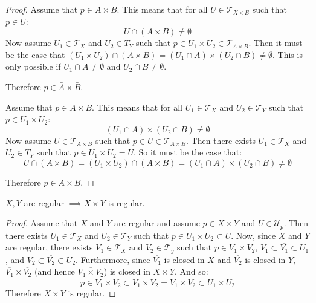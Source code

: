 \documentclass[letterpaper,12pt,fleqn]{article}
\newcommand{\T}{\mathscr{T}}
\newcommand{\U}{\mathcal{U}}
\begin{document}
\begin{proof}
  Assume that \(p\in\overline{A\times B}\).  This means that for all \(U\in\T_{X\times B}\) such that \(p\in U\):
  \[U\cap(A\times B)\ne\emptyset\]
  Now assume \(U_1\in\T_X\) and \(U_2\in T_Y\) such that \(p\in U_1\times U_2\in\T_{A\times B}\).  Then it must be the
  case that \((U_1\times U_2)\cap(A\times B)=(U_1\cap A)\times(U_2\cap B)\ne\emptyset\).  This is only possible if
  \(U_1\cap A\ne\emptyset\) and \(U_2\cap B\ne\emptyset\).

  Therefore \(p\in\bar{A}\times\bar{B}\).

  Assume that \(p\in\bar{A}\times\bar{B}\).  This means that for all \(U_1\in\T_X\) and \(U_2\in\T_Y\) such that
  \(p\in U_1\times U_2\):
  \[(U_1\cap A)\times(U_2\cap B)\ne\emptyset\]
  Now assume \(U\in\T_{A\times B}\) such that \(p\in U\in\T_{A\times B}\).  Then there exists \(U_1\in\T_X\) and
  \(U_2\in T_Y\) such that \(p\in U_1\times U_2=U\).  So it must be the case that:
  \[U\cap(A\times B)=(U_1\times U_2)\cap(A\times B)=(U_1\cap A)\times(U_2\cap B)\ne\emptyset\]

  Therefore \(p\in\overline{A\times B}\).
\end{proof}

\begin{theorem}
  \(X,Y\) are regular \(\implies X\times Y\) is regular.
\end{theorem}

\begin{proof}
  Assume that \(X\) and \(Y\) are regular and assume \(p\in X\times Y\) and \(U\in\U_p\).  Then there exists
  \(U_1\in\T_X\) and \(U_2\in\T_Y\) such that \(p\in U_1\times U_2\subset U\).  Now, since \(X\) and \(Y\) are
  regular, there exists \(V_1\in\T_X\) and \(V_2\in\T_y\) such that \(p\in V_1\times V_2\),
  \(V_1\subset\overline{V_1}\subset U_1\), and \(V_2\subset\overline{V_2}\subset U_2\).  Furthermore, since
  \(\overline{V_1}\) is closed in \(X\) and \(\overline{V_2}\) is closed in \(Y\),
  \(\overline{V_1}\times\overline{V_2}\) (and hence \(\overline{V_1\times V_2}\)) is closed in \(X\times Y\).
  And so:
  \[p\in V_1\times V_2\subset\overline{V_1\times V_2}=\overline{V_1}\times\overline{V_2}\subset U_1\times U_2\]
  Therefore \(X\times Y\) is regular.
\end{proof}
\end{document}
